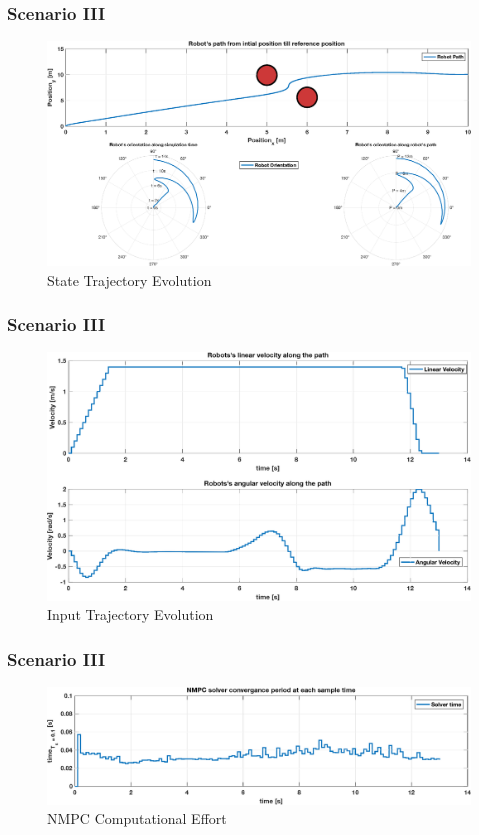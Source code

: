  	\begin{frame}
 		\frametitle{Scenario III}
 		\begin{figure}[hbtp]
 			\centering
 			\includegraphics[scale=0.44]{pictures/graphs/sn2_states.eps}
 			\caption{State Trajectory Evolution}
 		\end{figure}
 	\end{frame}
 	
 	\begin{frame}
 		\frametitle{Scenario III}
 		\begin{figure}[hbtp]
 			\centering
 			\includegraphics[scale=0.42]{pictures/graphs/sn2_inputs.eps}
 			\caption{Input Trajectory Evolution}
 		\end{figure}
 	\end{frame}
 	
 	\begin{frame}
 		\frametitle{Scenario III}
 		\begin{figure}[hbtp]
 			\centering
 			\includegraphics[scale=0.42]{pictures/graphs/sn2_solver_time.eps}
 			\caption{NMPC Computational Effort}
 		\end{figure}
 	\end{frame}
 
